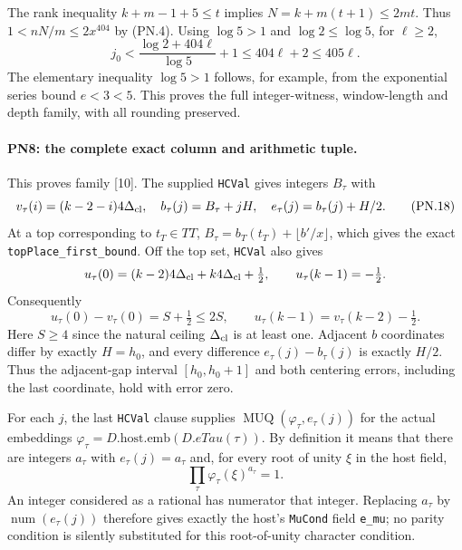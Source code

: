\documentclass[11pt,a4paper]{article}
\numberwithin{equation}{section}
\theoremstyle{remark}\newtheorem{remark}[theorem]{Remark}
\begin{document}
The rank inequality $k+m-1+5\leq t$ implies
$N=k+m(t+1)\leq2mt$. Thus $1<nN/m\leq2x^{404}$ by (PN.4).
Using $\log5>1$ and $\log2\leq\log5$, for $\ell\geq2$,
\[
 j_0<\frac{\log2+404\ell}{\log5}+1
         \leq404\ell+2\leq405\ell.                         \tag{PN.17}
\]
The elementary inequality $\log5>1$ follows, for example, from the
exponential series bound $e<3<5$. This proves the full integer-witness,
window-length and depth family, with all rounding preserved.

\paragraph{PN8: the complete exact column and arithmetic tuple.}
This proves family [10]. The supplied \texttt{HCVal} gives integers
$B_\tau$ with
\[
 v_\tau(i)=(k-2-i)4\Delta_{\rm cl},\quad
 b_\tau(j)=B_\tau+jH,\quad e_\tau(j)=b_\tau(j)+H/2.      \tag{PN.18}
\]
At a top corresponding to $t_T\in TT$,
$B_\tau=b_T(t_T)+\lfloor b'/x\rfloor$, which gives the exact
\texttt{topPlace\_\allowbreak first\_\allowbreak bound}. Off the top set, \texttt{HCVal}
also gives
\[
 u_\tau(0)=(k-2)4\Delta_{\rm cl}+k4\Delta_{\rm cl}+\tfrac12,
 \qquad u_\tau(k-1)=-\tfrac12.
\]
Consequently
\[
 u_\tau(0)-v_\tau(0)=S+\tfrac12\leq2S,
 \qquad u_\tau(k-1)=v_\tau(k-2)-\tfrac12.                 \tag{PN.19}
\]
Here $S\geq4$ since the natural ceiling $\Delta_{\rm cl}$ is at
least one. Adjacent $b$ coordinates differ by exactly $H=h_0$, and
every difference $e_\tau(j)-b_\tau(j)$ is exactly $H/2$.
Thus the adjacent-gap interval $[h_0,h_0+1]$ and both centering
errors, including the last coordinate, hold with error zero.

For each $j$, the last \texttt{HCVal} clause supplies
$\operatorname{MUQ}(\varphi_\tau,e_\tau(j))$ for the actual embeddings
$\varphi_\tau=D.\mathrm{host}.\mathrm{emb}(D.eTau(\tau))$.
By definition it means that there are integers $a_\tau$ with
$e_\tau(j)=a_\tau$ and, for every root of unity $\xi$ in the host field,
\[
                    \prod_\tau\varphi_\tau(\xi)^{a_\tau}=1.
                                                               \tag{PN.20}
\]
An integer considered as a rational has numerator that integer.
Replacing $a_\tau$ by $\operatorname{num}(e_\tau(j))$ therefore gives
exactly the host's \texttt{MuCond} field \texttt{e\_\allowbreak mu}; no parity
condition is silently substituted for this root-of-unity character
condition.
\end{document}
